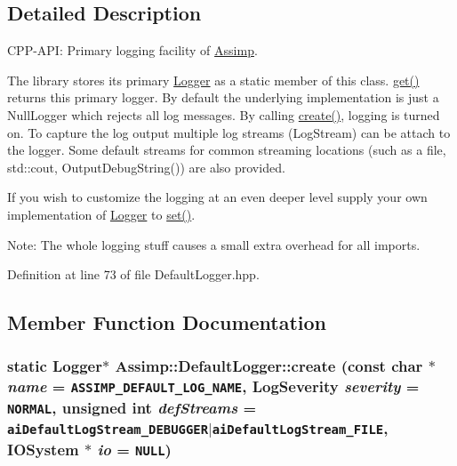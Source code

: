\subsection{Detailed Description}
CPP-API: Primary logging facility of \hyperlink{namespace_assimp}{Assimp}. 

The library stores its primary \hyperlink{class_assimp_1_1_logger_784e6d1a741072b17bab32a6a41055e8}{Logger} as a static member of this class. \hyperlink{class_assimp_1_1_default_logger_7d0a53f2db66945ade30094330a77ba4}{get()} returns this primary logger. By default the underlying implementation is just a NullLogger which rejects all log messages. By calling \hyperlink{class_assimp_1_1_default_logger_dccb11f85f8b0ef226c382e11ba665c3}{create()}, logging is turned on. To capture the log output multiple log streams (LogStream) can be attach to the logger. Some default streams for common streaming locations (such as a file, std::cout, OutputDebugString()) are also provided.

If you wish to customize the logging at an even deeper level supply your own implementation of \hyperlink{class_assimp_1_1_logger_784e6d1a741072b17bab32a6a41055e8}{Logger} to \hyperlink{class_assimp_1_1_default_logger_9daba548026045b99813c760c2842ed2}{set()}. \begin{Desc}
\item[Note:]The whole logging stuff causes a small extra overhead for all imports. \end{Desc}


Definition at line 73 of file DefaultLogger.hpp.

\subsection{Member Function Documentation}
\hypertarget{class_assimp_1_1_default_logger_dccb11f85f8b0ef226c382e11ba665c3}{
\subsubsection[create]{\setlength{\rightskip}{0pt plus 5cm}static {\bf Logger}$\ast$ Assimp::DefaultLogger::create (const char $\ast$ {\em name} = {\tt ASSIMP\_\-DEFAULT\_\-LOG\_\-NAME}, \/  {\bf LogSeverity} {\em severity} = {\tt NORMAL}, \/  unsigned int {\em defStreams} = {\tt aiDefaultLogStream\_\-DEBUGGER$|$aiDefaultLogStream\_\-FILE}, \/  {\bf IOSystem} $\ast$ {\em io} = {\tt NULL})}}
\label{class_assimp_1_1_default_logger_dccb11f85f8b0ef226c382e11ba665c3}


